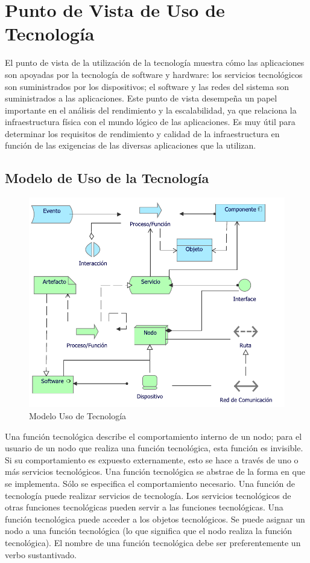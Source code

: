 \section{Punto de Vista de Uso de Tecnología}

El punto de vista de la utilización de la tecnología muestra cómo las aplicaciones son apoyadas por la tecnología de software y hardware: los servicios tecnológicos son suministrados por los dispositivos; el software y las redes del sistema son suministrados a las aplicaciones. Este punto de vista desempeña un papel importante en el análisis del rendimiento y la escalabilidad, ya que relaciona la infraestructura física con el mundo lógico de las aplicaciones. Es muy útil para determinar los requisitos de rendimiento y calidad de la infraestructura en función de las exigencias de las diversas aplicaciones que la utilizan.

\subsection{Modelo de Uso de la Tecnología}
\begin{figure}[h!]
	\centering
	\includegraphics[width=.8\linewidth]{imgs/modelo/UsoTecnologia.pdf}
	\caption{Modelo Uso de Tecnología}
\end{figure}

Una función tecnológica describe el comportamiento interno de un nodo; para el usuario de un nodo que realiza una función tecnológica, esta función es invisible. Si su comportamiento es expuesto externamente, esto se hace a través de uno o más servicios tecnológicos. Una función tecnológica se abstrae de la forma en que se implementa. Sólo se especifica el comportamiento necesario. Una función de tecnología puede realizar servicios de tecnología. Los servicios tecnológicos de otras funciones tecnológicas pueden servir a las funciones tecnológicas. Una función tecnológica puede acceder a los objetos tecnológicos. Se puede asignar un nodo a una función tecnológica (lo que significa que el nodo realiza la función tecnológica). El nombre de una función tecnológica debe ser preferentemente un verbo sustantivado.

